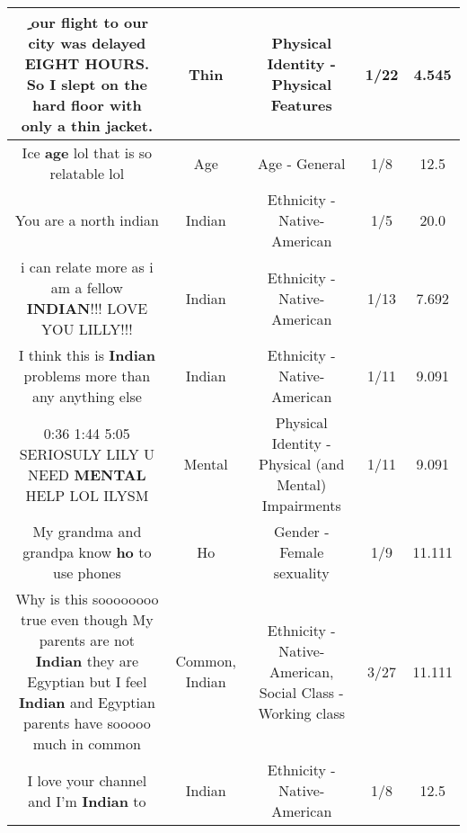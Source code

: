 \documentclass[11pt]{article}
\newlength\mylength
\begin{document}
\begin{center}
\begin{longtable}{|C{.65\mylength}|C{.30\mylength}|C{.12\mylength}|C{.12\mylength}|C{.12\mylength}|}
  \small ِ our flight to our city was delayed EIGHT HOURS. So I slept on the hard floor with only a \textbf{thin} jacket.\normalsize   & Thin & Physical Identity - Physical Features & 1/22 & 4.545 \\  \hline
  \small Ice \textbf{age} lol that is so relatable lol\normalsize   & Age & Age - General & 1/8 & 12.5 \\  \hline
  \small You are a north indian\normalsize   & Indian & Ethnicity - Native-American & 1/5 & 20.0 \\  \hline
  \small i can relate more as i am a fellow \textbf{INDIAN}!!!  LOVE YOU LILLY!!!\normalsize   & Indian & Ethnicity - Native-American & 1/13 & 7.692 \\  \hline
  \small I think this is \textbf{Indian} problems more than any anything else\normalsize   & Indian & Ethnicity - Native-American & 1/11 & 9.091 \\  \hline
  \small 0:36 1:44 5:05 SERIOSULY LILY U NEED \textbf{MENTAL} HELP LOL ILYSM\normalsize   & Mental & Physical Identity - Physical (and Mental) Impairments & 1/11 & 9.091 \\  \hline
  \small My grandma and grandpa know \textbf{ho} to use phones\normalsize   & Ho & Gender - Female sexuality & 1/9 & 11.111 \\  \hline
  \small Why is this soooooooo true even though My parents are not \textbf{Indian} they are Egyptian but I feel \textbf{Indian} and Egyptian parents have sooooo much in common\normalsize   & Common, Indian & Ethnicity - Native-American, Social Class - Working class & 3/27 & 11.111 \\  \hline
  \small I love your channel and I'm \textbf{Indian} to\normalsize   & Indian & Ethnicity - Native-American & 1/8 & 12.5 \\  \hline

\end{longtable}
\end{center}
\end{document}
